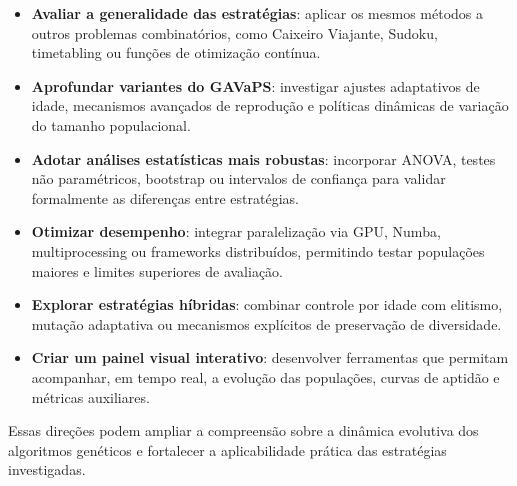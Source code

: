 \begin{itemize}
\item \textbf{Avaliar a generalidade das estratégias}: aplicar os mesmos métodos a outros problemas combinatórios, como Caixeiro Viajante, Sudoku, timetabling ou funções de otimização contínua.
\item \textbf{Aprofundar variantes do GAVaPS}: investigar ajustes adaptativos de idade, mecanismos avançados de reprodução e políticas dinâmicas de variação do tamanho populacional.

\item \textbf{Adotar análises estatísticas mais robustas}: incorporar ANOVA, testes não paramétricos, bootstrap ou intervalos de confiança para validar formalmente as diferenças entre estratégias.

\item \textbf{Otimizar desempenho}: integrar paralelização via GPU, Numba, multiprocessing ou frameworks distribuídos, permitindo testar populações maiores e limites superiores de avaliação.

\item \textbf{Explorar estratégias híbridas}: combinar controle por idade com elitismo, mutação adaptativa ou mecanismos explícitos de preservação de diversidade.

\item \textbf{Criar um painel visual interativo}: desenvolver ferramentas que permitam acompanhar, em tempo real, a evolução das populações, curvas de aptidão e métricas auxiliares.

\end{itemize}

Essas direções podem ampliar a compreensão sobre a dinâmica evolutiva dos algoritmos genéticos e fortalecer a aplicabilidade prática das estratégias investigadas.